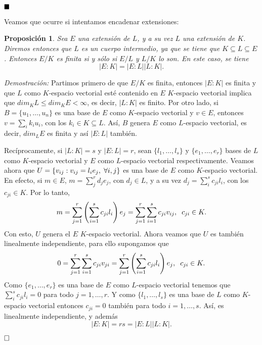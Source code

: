 \documentclass[12pt]{article}
\newtheorem{proposition}[theorem]{Proposición}
\begin{document}
$\hfill \blacksquare$

Veamos que ocurre si intentamos encadenar extensiones:
\begin{proposition} \label{eq:trgr} Sea $E$ una extensión de $L$, y a su vez $L$ una extensión de $K$. Diremos entonces que $L$ es un cuerpo intermedio, ya que se tiene que $K \subseteq L \subseteq E$. Entonces $E/K$ es finita si y sólo si $E/L$ y $L/K$ lo son. En este caso, se tiene $$|E: K| = |E:L| |L:K|.$$
\end{proposition}
\emph{Demostración: } Partimos primero de que $E/K$ es finita, entonces $|E:K|$ es finita y que $L$ como $K$-espacio vectorial esté contenido en $E$ $K$-espacio vectorial implica que $dim_{K} L \leq dim_{K} E < \infty$, es decir, $|L:K|$ es finito. Por otro lado, si $B = \lbrace u_{1}, \ldots, u_{n}\rbrace$ es una base de $E$ como $K$-espacio vectorial y $v \in E$, entonces $v = \sum_{i} k_{i}u_{i}$, con los $k_{i} \in K \subseteq L$. Así, $B$ genera $E$ como $L$-espacio vectorial, es decir, $dim_{L}E$ es finita y así $|E:L|$ también.

Recíprocamente, si $|L:K| = s$ y $|E:L| = r$, sean $\lbrace l_{1}, \ldots, l_{s} \rbrace$ y $\lbrace e_{1}, \ldots, e_{r} \rbrace$ bases de $L$ como $K$-espacio vectorial y $E$ como $L$-espacio vectorial respectivamente. Veamos ahora que $U= \lbrace v_{ij} : v_{ij} = l_{i}e_{j}, \hspace{0.1cm} \forall i,j \rbrace$ es una base de $E$ como $K$-espacio vectorial. En efecto, si $m \in E$, $m = \sum_{j}^{r}d_{j}e_{j}$, con $d_{j} \in L$, y a su vez $d_{j} = \sum_{i}^{s}c_{ji}l_{i}$, con los $c_{ji} \in K$. Por lo tanto, $$m = \sum_{j=1}^{r} \left(\sum_{i=1}^{s} c_{ji}l_{i}\right) e_{j} = \sum_{j=1}^{r} \sum_{i=1}^{s}c_{ji}v_{ij}, \hspace{0.2cm} c_{ji} \in K.$$ Con esto, $U$ genera el $E$ $K$-espacio vectorial. Ahora veamos que $U$ es también linealmente independiente, para ello supongamos que $$0 = \sum_{j=1}^{r} \sum_{i=1}^{s} c_{ji}v_{ji} = \sum_{j=1}^{r}\left(\sum_{i=1}^{s} c_{ji}l_{i}\right) e_{j}, \hspace{0.2cm} c_{ji} \in K.$$ Como $\lbrace e_{1}, \ldots, e_{r} \rbrace$ es una base de $E$ como $L$-espacio vectorial tenemos que $\sum_{i}^{s} c_{ji}l_{i} = 0$ para todo $j=1, \ldots, r$. Y como $\lbrace l_{1}, \ldots, l_{s} \rbrace$ es una base de $L$ como $K$-espacio vectorial entonces $c_{ji} = 0$ también para todo $i = 1, \ldots, s$. Así, es linealmente independiente, y además $$|E:K| = rs = |E:L| |L:K|.$$

$\hfill \square$
\end{document}
